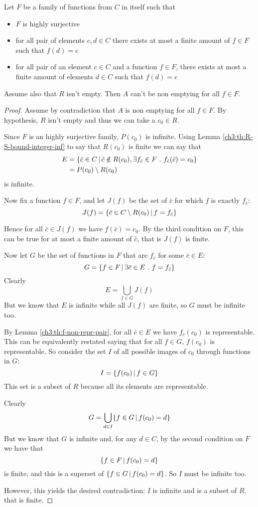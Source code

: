 \begin{theorem}\label{ch4:th:non-empt-res-global}
	Let $F$ be a family of functions from $C$ in itself such that
	\begin{itemize}
		\item $F$ is highly surjective
		\item for all pair of elements $c, d \in C$ there exists at most a finite amount of $f \in F$ such that $f(d) = c$
		\item for all pair of an element $c \in C$ and a function $f \in F$, there exists at most a finite amount of elements $d \in C$ such that $f(d) = c$
	\end{itemize}
	Assume also that $R$ isn't empty. Then $A$ can't be non emptying for all $f \in F$.
\end{theorem}
\begin{proof}
	Assume by contradiction that $A$ is non emptying for all $f \in F$. By hypothesis, $R$ isn't empty and thus we can take a $c_0 \in R$.

	Since $F$ is an highly surjective family, $P(c_0)$ is infinite. Using Lemma \ref{ch3:th:R-S-bound-integer-inf} to say that $R(c_0)$ is finite we can say that
	\begin{align*}
		E &= \{ \bar{c} \in C \,\vert\, \bar{c} \notin R(c_0), \exists f_{\bar{c}} \in F\ .\ f_{\bar{c}}(\bar{c}) = c_0 \} \\
		&= P(c_0) \setminus R(c_0)
	\end{align*}
	is infinite.

	Now fix a function $f \in F$, and let $J(f)$ be the set of $\bar{c}$ for which $f$ is exactly $f_{\bar{c}}$:
	\[
	J(f) = \{ \bar{c} \in C \setminus R(c_0) \,\vert\, f = f_{\bar{c}} \}
	\]

	Hence for all $\bar{c} \in J(f)$ we have $f(\bar{c}) = c_0$. By the third condition on $F$, this can be true for at most a finite amount of $\bar{c}$, that is $J(f)$ is finite.

	Now let $G$ be the set of functions in $F$ that are $f_{\bar{c}}$ for some $\bar{c} \in E$:
	\[
	G = \{ f \in F \,\vert\, \exists \bar{c} \in E\ .\ f = f_{\bar{c}} \}
	\]
	Clearly
	\[
	E = \bigcup\limits_{f \in G} J(f)
	\]
	But we know that $E$ is infinite while all $J(f)$ are finite, so $G$ must be infinite too.

	By Lemma \ref{ch3:th:f-non-repr-pair}, for all $\bar{c} \in E$ we have $f_{\bar{c}}(c_0)$ is representable. This can be equivalently restated saying that for all $f \in G$, $f(c_0)$ is representable.
	So consider the set $I$ of all possible images of $c_0$ through functions in $G$:
	\[
	I = \{ f(c_0) \,\vert\, f \in G \}
	\]
	This set is a subset of $R$ because all its elements are representable.

	Clearly
	\[
	G = \bigcup\limits_{d \in I} \{ f \in G \,\vert\, f(c_0) = d \}
	\]
	But we know that $G$ is infinite and, for any $d \in C$, by the second condition on $F$ we have that
	\[
	\{ f \in F \,\vert\, f(c_0) = d \}
	\]
	is finite, and this is a superset of $\{ f \in G \,\vert\, f(c_0) = d \}$. So $I$ must be infinite too.

	However, this yields the desired contradiction: $I$ is infinite and is a subset of $R$, that is finite.
\end{proof}

